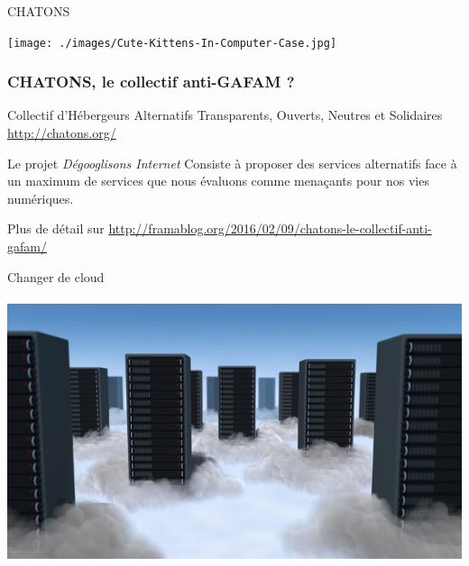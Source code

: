 \documentclass{beamer}
\begin{document}
\begin{frame}
\Huge{\centerline{CHATONS}}
\begin{center}
\texttt{[image: ./images/Cute-Kittens-In-Computer-Case.jpg]}
\end{center}
\end{frame}

\begin{frame}
\frametitle{CHATONS, le collectif anti-GAFAM ?}
Collectif d'Hébergeurs Alternatifs Transparents, Ouverts, Neutres et Solidaires \url{http://chatons.org/}

\begin{block}{Le projet \emph{Dégooglisons Internet} }
Consiste à proposer des services alternatifs face à un maximum de services que nous évaluons comme menaçants pour nos vies numériques.
\end{block}
Plus de détail sur \url{http://framablog.org/2016/02/09/chatons-le-collectif-anti-gafam/}

\end{frame}


\begin{frame}
\begin{center}
\Huge{Changer de cloud}
\\~\\
\includegraphics[scale=0.5] {./images/cloud_data_center.jpg}
\end{center}
\end{frame}
\end{document}
